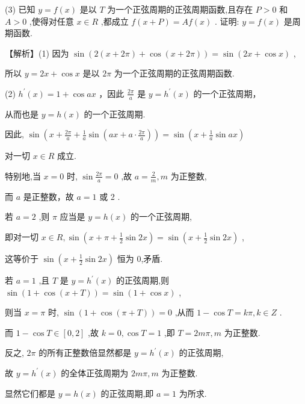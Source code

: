 \documentclass[10pt]{article}
\begin{document}
(3) 已知 \(y = f\left( x\right)\) 是以 \(T\) 为一个正弦周期的正弦周期函数,且存在 \(P > 0\) 和 \(A > 0\) ,使得对任意 \(x \in  R\) ,都成立 \(f\left( {x + P}\right)  = {Af}\left( x\right)\) . 证明: \(y = f\left( x\right)\) 是周期函数.

【解析】(1) 因为 \(\sin \left( {2\left( {x + {2\pi }}\right)  + \cos \left( {x + {2\pi }}\right) }\right)  = \sin \left( {{2x} + \cos x}\right)\) ,

所以 \(y = {2x} + \cos x\) 是以 \({2\pi }\) 为一个正弦周期的正弦周期函数.

(2) \({h}^{\prime }\left( x\right)  = 1 + \cos {ax}\) ，因此 \(\frac{2\pi }{a}\) 是 \(y = {h}^{\prime }\left( x\right)\) 的一个正弦周期，

从而也是 \(y = h\left( x\right)\) 的一个正弦周期.

因此, \(\sin \left( {x + \frac{2\pi }{a} + \frac{1}{a}\sin \left( {{ax} + a \cdot  \frac{2\pi }{a}}\right) }\right)  = \sin \left( {x + \frac{1}{a}\sin {ax}}\right)\)

对一切 \(x \in  R\) 成立.

特别地,当 \(x = 0\) 时, \(\sin \frac{2\pi }{a} = 0\) ,故 \(a = \frac{2}{m},m\) 为正整数,

而 \(a\) 是正整数，故 \(a = 1\) 或 2 .

若 \(a = 2\) ,则 \(\pi\) 应当是 \(y = h\left( x\right)\) 的一个正弦周期,

即对一切 \(x \in  R,\sin \left( {x + \pi  + \frac{1}{2}\sin {2x}}\right)  = \sin \left( {x + \frac{1}{2}\sin {2x}}\right)\) ,

这等价于 \(\sin \left( {x + \frac{1}{2}\sin {2x}}\right)\) 恒为 0,矛盾.

若 \(a = 1\) ,且 \(T\) 是 \(y = {h}^{\prime }\left( x\right)\) 的正弦周期,则 \(\sin \left( {1 + \cos \left( {x + T}\right) }\right)  = \sin \left( {1 + \cos x}\right)\) ,

则当 \(x = \pi\) 时, \(\sin \left( {1 + \cos \left( {\pi  + T}\right) }\right)  = 0\) ,从而 \(1 - \cos T = {k\pi },k \in  Z\) .

而 \(1 - \cos T \in  \left\lbrack  {0,2}\right\rbrack\) ,故 \(k = 0,\cos T = 1\) ,即 \(T = {2m\pi },m\) 为正整数.

反之, \({2\pi }\) 的所有正整数倍显然都是 \(y = {h}^{\prime }\left( x\right)\) 的正弦周期,

故 \(y = {h}^{\prime }\left( x\right)\) 的全体正弦周期为 \({2m\pi },m\) 为正整数.

显然它们都是 \(y = h\left( x\right)\) 的正弦周期,即 \(a = 1\) 为所求.
\end{document}
